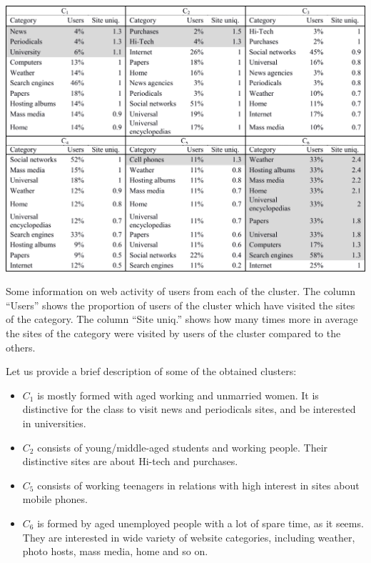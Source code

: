 \documentclass[runningheads,a4paper]{llncs}
\begin{document}
\begin{table}
	\includegraphics[width=\linewidth]{t2.pdf}
	
	\caption{Some information on web activity of users from each of the cluster. The column ``Users'' shows the proportion of users of the cluster which have visited the sites of the category. The column ``Site uniq.'' shows how many times more in average the sites of the category were visited by users   of the cluster compared to the others.}
	\label{01Yti}
\end{table}

Let us provide a brief description of some of the obtained clusters:
\begin{itemize}
	\item $C_1$ is mostly formed with aged working and unmarried women. It is distinctive for the class to visit news and periodicals sites, and be interested in universities.
    
    \item $C_2$ consists of young/middle-aged students and working people. Their distinctive sites are about Hi-tech and purchases.

	\item $C_5$ consists of working teenagers in relations with high interest in sites about mobile phones.
    
	\item $C_6$ is formed by aged unemployed people with a lot of spare time, as it seems. They are interested in wide variety of website categories, including weather, photo hosts, mass media, home and so on.
\end{itemize}
\end{document}
